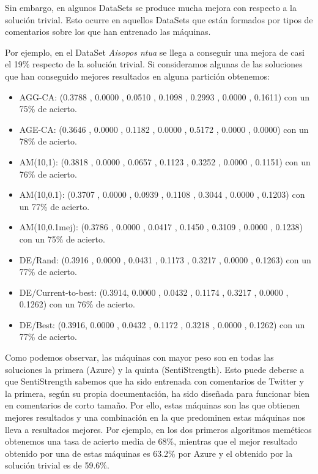 \documentclass{article}
\begin{document}
Sin embargo, en algunos DataSets se produce mucha mejora con respecto a la solución trivial. Esto ocurre en aquellos DataSets que están formados por tipos de comentarios sobre los que han entrenado las máquinas.

Por ejemplo, en el DataSet \textit{Aisopos ntua} se llega a conseguir una mejora de casi el 19\% respecto de la solución trivial. Si consideramos algunas de las soluciones que han conseguido mejores resultados en alguna partición obtenemos:

\begin{itemize}
	\item AGG-CA: (0.3788 , 0.0000 , 0.0510 , 0.1098 , 0.2993 , 0.0000 , 0.1611) con un 75\% de acierto.
	\item AGE-CA: (0.3646  , 0.0000 , 0.1182 , 0.0000 , 0.5172 , 0.0000 , 0.0000) con un 78\% de acierto.
	\item AM(10,1): (0.3818  , 0.0000 , 0.0657 , 0.1123 , 0.3252 , 0.0000 , 0.1151) con un 76\% de acierto.
	\item AM(10,0.1): (0.3707 , 0.0000 , 0.0939 , 0.1108 , 0.3044 , 0.0000 , 0.1203) con un 77\% de acierto. 
	\item AM(10,0.1mej): (0.3786 , 0.0000 , 0.0417  , 0.1450 , 0.3109 , 0.0000 , 0.1238) con un 75\% de acierto. 
	\item DE/Rand: (0.3916 , 0.0000 , 0.0431 , 0.1173 , 0.3217 , 0.0000 , 0.1263) con un 77\% de acierto. 
	\item DE/Current-to-best: (0.3914, 0.0000 , 0.0432 , 0.1174 , 0.3217 , 0.0000 , 0.1262) con un 76\% de acierto. 
	\item DE/Best: (0.3916, 0.0000 , 0.0432 , 0.1172 , 0.3218 , 0.0000 , 0.1262) con un 77\% de acierto.
\end{itemize}

Como podemos observar, las máquinas con mayor peso son en todas las soluciones la primera (Azure) y la quinta (SentiStrength). Esto puede deberse a que SentiStrength sabemos que ha sido entrenada con comentarios de Twitter y la primera, según su propia documentación, ha sido diseñada para funcionar bien en comentarios de corto tamaño. Por ello, estas máquinas son las que obtienen mejores resultados y una combinación en la que predominen estas máquinas nos lleva a resultados mejores. Por ejemplo, en los dos primeros algoritmos meméticos obtenemos una tasa de acierto media de 68\%, mientras que el mejor resultado obtenido por una de estas máquinas es 63.2\% por Azure y el obtenido por la solución trivial es de 59.6\%.
\end{document}
